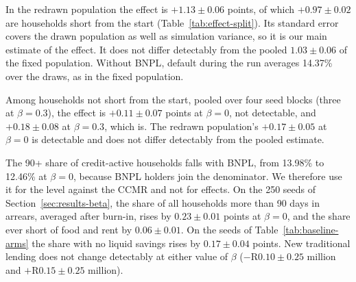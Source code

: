 

In the redrawn population the effect is $+1.13 \pm 0.06$ points, of which $+0.97 \pm 0.02$ are
households short from the start (Table~\ref{tab:effect-split}). Its standard error covers the
drawn population as well as simulation variance, so it is our main estimate of the effect. It
does not differ detectably
from the pooled $1.03 \pm 0.06$ of the fixed population. Without \ac{BNPL}, default during the run averages 14.37\%
over the draws, as in the fixed population.

Among households not short from the start, pooled over four seed blocks
(three at $\beta=0.3$), the effect is $+0.11 \pm 0.07$ points at $\beta=0$, not detectable,
and $+0.18 \pm 0.08$ at $\beta=0.3$, which is. The redrawn population's $+0.17 \pm 0.05$ at
$\beta=0$ is detectable and does not differ detectably from the pooled estimate.

The 90+ share of credit-active households falls with \ac{BNPL}, from 13.98\% to 12.46\% at
$\beta=0$, because \ac{BNPL} holders join the denominator. We therefore use it for the level
against the \ac{CCMR} and not for effects. On the 250 seeds of Section~\ref{sec:results-beta},
the share of all households more than 90 days in arrears, averaged after burn-in, rises by
$0.23 \pm 0.01$ points at $\beta=0$, and the share ever short of food and rent by
$0.06 \pm 0.01$. On the seeds of Table~\ref{tab:baseline-arms} the share with no liquid savings
rises by $0.17 \pm 0.04$ points. New traditional lending does not change detectably at either
value of $\beta$ ($-$R$0.10 \pm 0.25$ million and $+$R$0.15 \pm 0.25$ million).


